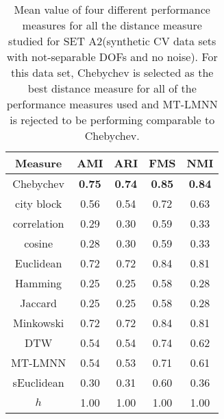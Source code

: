 \begin{table}[h]
     \centering
    \begin{tabular}{ |c|c|c|c|c| }
      \hline
    Measure    & 	 AMI &	 ARI &	 FMS &	 NMI \\
    \hline
    Chebychev  &	 \textbf{0.75} 	& \textbf{0.74} &	 \textbf{0.85} &	\textbf{0.84} \\
    city block  	& 0.56 	& 0.54 &	 0.72 &	0.63 \\
    correlation &	 0.29 &	 0.30 &	 0.59 &	0.33 \\
    cosine     &	 0.28 	& 0.30 	& 0.59& 	0.33 \\
    Euclidean & 	 0.72 &	 0.72 &	 0.84 &	0.81 \\
    Hamming  &  	 0.25 	& 0.25 &	 0.58 &	0.28 \\
    Jaccard   & 	 0.25 &	 0.25 &	 0.58 &	0.28 \\
    Minkowski  &	 0.72 	& 0.72 &	 0.84 &	0.81 \\
    DTW      &  	 0.54 &	 0.54 &	 0.74 &	0.62 \\
    MT-LMNN   & 	 0.54 &	 0.53 &	 0.71 &	0.61 \\
    sEuclidean &	 0.30 &	 0.31 &	 0.60 &	0.36 \\
    \hline
    $h$   &  	 1.00 &	 1.00 &	 1.00 &	1.00 \\
    \hline
    \end{tabular}
    \captionsetup{justification=centering}
     \caption{Mean value of four different performance measures for all the distance measure studied for SET A2(synthetic CV data sets with not-separable DOFs and no noise). For this data set, Chebychev is selected as the best distance measure for all of the performance measures used and MT-LMNN is rejected to be performing comparable to Chebychev.}
     \label{ttest_seta2}
 \end{table}
 
